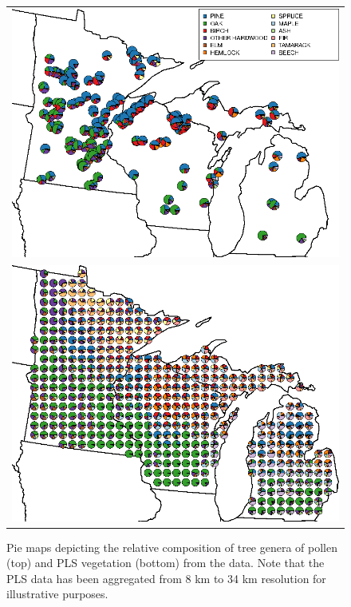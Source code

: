 \begin{figure}
\centering
\begin{tabular}{c}
\includegraphics[width=5in]{figures/pie_plot_pollen_ALL_v0_3.png} \\
\includegraphics[width=5in]{figures/pie_plot_pls_ALL_v0_3.png}
\end{tabular}
\caption{Pie maps depicting the relative composition of tree genera of pollen (top)
  and PLS vegetation (bottom) from the data. Note that the PLS data
  has been aggregated from 8 km to 34 km resolution for illustrative
  purposes.}
\label{fig:pie}
\end{figure}


